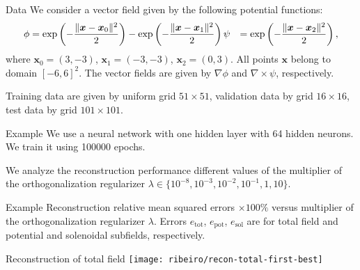 \documentclass[11pt,aspectratio=169,t]{beamer}
\def\\{}%
\renewcommand{\vec}[1]{\boldsymbol{#1}}
\DeclarePairedDelimiter\norm{\lVert}{\rVert}
\newcommand{\Grad}{\nabla}
\newcommand{\Curl}{\nabla \! \times \!}
\begin{document}
\begin{frame}{Data}
We consider a vector field given by the following potential
functions:
\begin{align}
\phi &= \exp\left( - \frac{\norm{\vec x - \vec x_0}{}^2}{2} \right)
    - \exp\left( - \frac{\norm{\vec x - \vec x_1}{}^2}{2} \right) \\
\psi &= \exp\left( - \frac{\norm{\vec x - \vec x_2}{}^2}{2} \right),
\end{align}
where $\vec x_0 = (3, -3)$, $\vec x_1 = (-3, -3)$, $\vec x_2 = (0, 3)$.
All points $\vec x$ belong to domain $[-6, 6]^2$.
The vector fields are given by $\Grad \phi$ and $\Curl \psi$, respectively.

Training data are given by uniform grid $51 \times 51$, validation data
by grid $16 \times 16$, test data by grid $101 \times 101$.
\end{frame}

\begin{frame}{Example}
We use a neural network with one hidden layer with 64 hidden neurons.
We train it using \num{100000} epochs.

We analyze the reconstruction performance different values of the multiplier
of the orthogonalization regularizer
$\lambda \in \{  10^{-8}, 10^{-3}, 10^{-2}, 10^{-1}, 1, 10 \}$.
\end{frame}

\begin{frame}{Example}
\centering
Reconstruction relative mean squared errors $\times 100\%$ versus multiplier of the
orthogonalization regularizer $\lambda$.
Errors $e_{\text{tot}}$, $e_{\text{pot}}$, $e_{\text{sol}}$ are for total field
and potential and solenoidal subfields, respectively.

\centering

\end{frame}

\begin{frame}{Reconstruction of total field}
\centering
\vspace{0.5cm}
\texttt{[image: ribeiro/recon-total-first-best]}
\end{frame}
\end{document}
